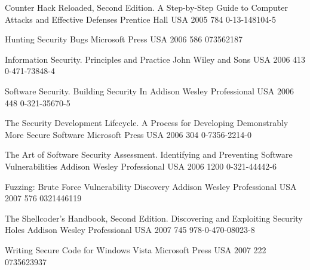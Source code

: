 \begin{thebibliography}{9}
		{
			\BibAnd
			}
		{Counter Hack Reloaded, Second Edition. A Step-by-Step Guide to Computer Attacks and Effective Defenses}
		{}
		{Prentice Hall}
		{USA}
		{2005}
		{784}
		{0-13-148104-5}
	
		{
			\BibAnd
			\BibAnd
			}
		{Hunting Security Bugs}
		{}
		{Microsoft Press}
		{USA}
		{2006}
		{586}
		{073562187}
	
		{}
		{Information Security. Principles and Practice}
		{}
		{John Wiley and Sons}
		{USA}
		{2006}
		{413}
		{0-471-73848-4}
	
		{}
		{Software Security. Building Security In}
		{}
		{Addison Wesley Professional}
		{USA}
		{2006}
		{448}
		{0-321-35670-5}
	
		{
			\BibAnd
			}
		{The Security Development Lifecycle. A Process for Developing Demonstrably More Secure Software}
		{}
		{Microsoft Press}
		{USA}
		{2006}
		{304}
		{0-7356-2214-0}
	
		{
			\BibAnd
			\BibAnd
			}
		{The Art of Software Security Assessment. Identifying and Preventing Software Vulnerabilities}
		{}
		{Addison Wesley Professional}
		{USA}
		{2006}
		{1200}
		{0-321-44442-6}
	
		{
			\BibAnd
			\BibAnd
			}
		{Fuzzing: Brute Force Vulnerability Discovery}
		{}
		{Addison Wesley Professional}
		{USA}
		{2007}
		{576}
		{0321446119}
	
		{
			\BibAnd
			\BibAnd
			\BibAnd
			}
		{The Shellcoder's Handbook, Second Edition. Discovering and Exploiting Security Holes}
		{}
		{Addison Wesley Professional}
		{USA}
		{2007}
		{745}
		{978-0-470-08023-8}
	
		{
			\BibAnd
			}
		{Writing Secure Code for {W}indows {V}ista}
		{}
		{Microsoft Press}
		{USA}
		{2007}
		{222}
		{0735623937}
	

\end{thebibliography}
